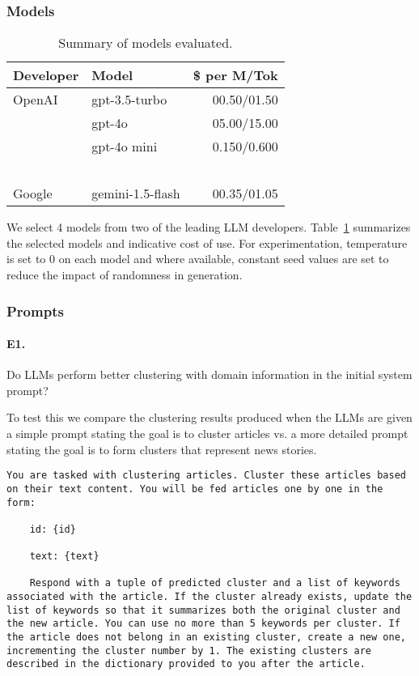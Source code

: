 \subsubsection{Models}

\begin{table}[ht!]
    \centering
    \begin{tabular}{l|lr}
        \textbf{Developer} & \textbf{Model} & \textbf{\$ per M/Tok} \\
        \hline
        OpenAI  & gpt-3.5-turbo     & 00.50/01.50 \\
        ~       & gpt-4o             & 05.00/15.00 \\
        ~       & gpt-4o mini       & 0.150/0.600 \\
        ~       & ~                 & ~     \\
        Google  & gemini-1.5-flash  & 00.35/01.05 \\
    \end{tabular}
    \caption{Summary of models evaluated.}
    \label{tab:models}
\end{table}

We select 4 models from two of the leading LLM developers. 
Table~\ref{tab:models} summarizes the selected models and indicative cost of use. 
For experimentation, temperature is set to $0$ on each model and where available, constant seed values are set to reduce the impact of randomness in generation.


\subsubsection{Prompts}

\paragraph{\textbf{E1.}}
Do LLMs perform better clustering with domain information in the initial system prompt?

\noindent To test this we compare the clustering results produced when the LLMs are given a simple prompt stating the goal is to cluster articles vs. a more detailed prompt stating the goal is to form clusters that represent news stories.

\begin{lstlisting}[title=Prompt 1: Generic Initial System Prompt]
    You are tasked with clustering articles. Cluster these articles based on their text content. You will be fed articles one by one in the form:

    id: {id}
    
    text: {text}
    
    Respond with a tuple of predicted cluster and a list of keywords associated with the article. If the cluster already exists, update the list of keywords so that it summarizes both the original cluster and the new article. You can use no more than 5 keywords per cluster. If the article does not belong in an existing cluster, create a new one, incrementing the cluster number by 1. The existing clusters are described in the dictionary provided to you after the article.
\end{lstlisting}


